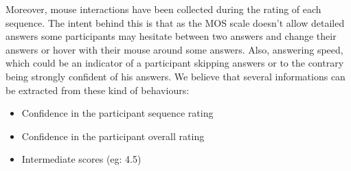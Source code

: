 Moreover, mouse interactions have been collected during the rating of each sequence. The intent behind this is that as the MOS scale doesn't allow detailed answers some participants may hesitate between two answers and change their answers or hover with their mouse around some answers. Also, answering speed, which could be an indicator of a participant skipping answers or to the contrary being strongly confident of his answers. We believe that several informations can be extracted from these kind of behaviours:
\begin{itemize}
	\item Confidence in the participant sequence rating
	\item Confidence in the participant overall rating
	\item Intermediate scores (eg: 4.5)
\end{itemize}
